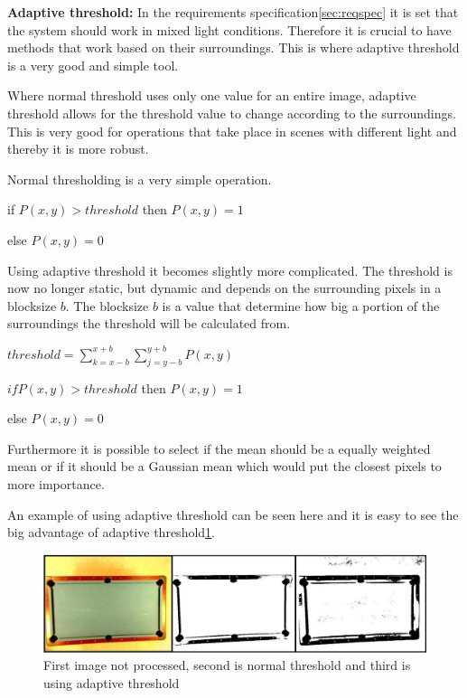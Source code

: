 \textbf{Adaptive threshold:}
In the requirements specification\ref{sec:reqspec} it is set that the system should work in mixed light conditions. Therefore it is crucial to have methods that work based on their surroundings. This is where adaptive threshold is a very good and simple tool.

Where normal threshold uses only one value for an entire image, adaptive threshold allows for the threshold value to change according to the surroundings. This is very good for operations that take place in scenes with different light and thereby it is more robust.

Normal thresholding is a very simple operation.

\begin{center}
	if $P(x,y) > threshold$ then $P(x,y) = 1$

	else $P(x,y) = 0$
\end{center}

Using adaptive threshold it becomes slightly more complicated. The threshold is now no longer static, but dynamic and depends on the surrounding pixels in a blocksize $b$. The blocksize $b$ is a value that determine how big a portion of the surroundings the threshold will be calculated from.

\begin{center}
	$threshold = \sum_{k=x-b}^{x+b} \sum_{j=y-b}^{y+b} P(x,y)$

	$if  P(x,y) > threshold$ then $P(x,y) = 1$

	else $P(x,y) = 0$
\end{center}

Furthermore it is possible to select if the mean should be a equally weighted mean or if it should be a Gaussian mean which would put the closest pixels to more importance.

An example of using adaptive threshold can be seen here and it is easy to see the big advantage of adaptive threshold\ref{fig:adaptivethreshold}. 

\begin{figure}[htpb]
\begin{center}
\leavevmode
\includegraphics[width=1\textwidth]{images/adaptive_threshold.JPG}
\end{center}
\caption{First image not processed, second is normal threshold and third is using adaptive threshold}
\label{fig:adaptivethreshold}
\end{figure}

